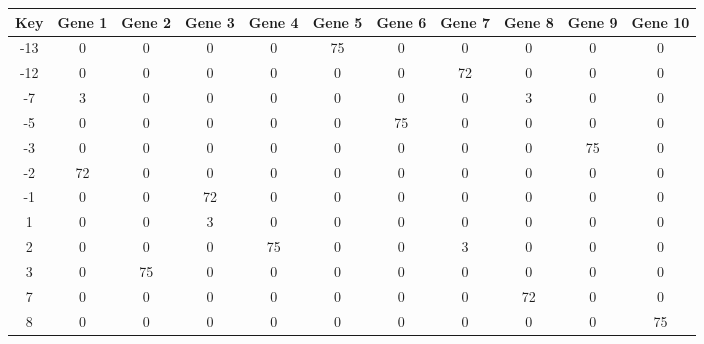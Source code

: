 \begin{tabular}{|c|c|c|c|c|c|c|c|c|c|c|}
\hline
Key & Gene 1 & Gene 2 & Gene 3 & Gene 4 & Gene 5 & Gene 6 & Gene 7 & Gene 8 & Gene 9 & Gene 10 \\
\hline
-13 & 0 & 0 & 0 & 0 & 75 & 0 & 0 & 0 & 0 & 0 \\
-12 & 0 & 0 & 0 & 0 & 0 & 0 & 72 & 0 & 0 & 0 \\
-7 & 3 & 0 & 0 & 0 & 0 & 0 & 0 & 3 & 0 & 0 \\
-5 & 0 & 0 & 0 & 0 & 0 & 75 & 0 & 0 & 0 & 0 \\
-3 & 0 & 0 & 0 & 0 & 0 & 0 & 0 & 0 & 75 & 0 \\
-2 & 72 & 0 & 0 & 0 & 0 & 0 & 0 & 0 & 0 & 0 \\
-1 & 0 & 0 & 72 & 0 & 0 & 0 & 0 & 0 & 0 & 0 \\
1 & 0 & 0 & 3 & 0 & 0 & 0 & 0 & 0 & 0 & 0 \\
2 & 0 & 0 & 0 & 75 & 0 & 0 & 3 & 0 & 0 & 0 \\
3 & 0 & 75 & 0 & 0 & 0 & 0 & 0 & 0 & 0 & 0 \\
7 & 0 & 0 & 0 & 0 & 0 & 0 & 0 & 72 & 0 & 0 \\
8 & 0 & 0 & 0 & 0 & 0 & 0 & 0 & 0 & 0 & 75 \\
\hline
\end{tabular}
